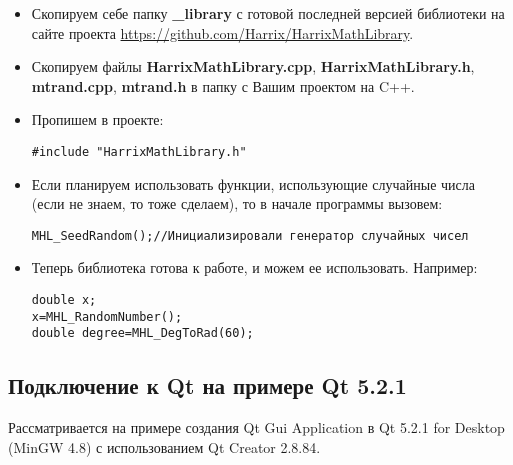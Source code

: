 \documentclass[a4paper,12pt]{article}
\begin{document}
\begin{itemize}
\item Скопируем себе папку \textbf{\_library} с готовой последней версией библиотеки на сайте проекта \href{https://github.com/Harrix/HarrixMathLibrary}{https://github.com/Harrix/HarrixMathLibrary}.

\item Скопируем файлы \textbf{HarrixMathLibrary.cpp}, \textbf{HarrixMathLibrary.h}, \textbf{mtrand.cpp}, \textbf{mtrand.h} в папку с Вашим проектом на C++.

\item Пропишем в проекте:
\begin{lstlisting}[label=install_01,caption=Подключение библиотеки]
#include "HarrixMathLibrary.h"
\end{lstlisting}

\item Если планируем использовать функции, использующие случайные числа (если не знаем, то тоже сделаем), то в начале программы вызовем:
\begin{lstlisting}[label=install_02,caption=Инициализация генератора случайных чисел]
MHL_SeedRandom();//Инициализировали генератор случайных чисел
\end{lstlisting}

\item Теперь библиотека готова к работе, и можем ее использовать. Например:
\begin{lstlisting}[label=install_03,caption=Пример использования]
double x;
x=MHL_RandomNumber();
double degree=MHL_DegToRad(60);
\end{lstlisting}
\end{itemize}


\subsection{Подключение к Qt на примере Qt 5.2.1}

Рассматривается на примере создания Qt Gui Application в Qt 5.2.1 for Desktop (MinGW 4.8) с использованием Qt Creator 2.8.84.
\end{document}
